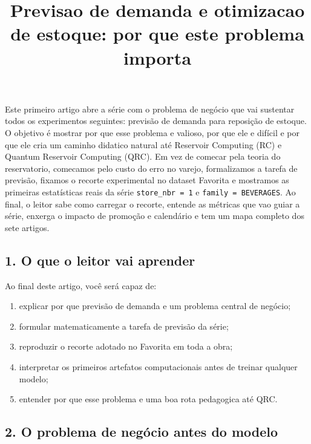 \documentclass[12pt]{article}
\title{Previsao de demanda e otimizacao de estoque: por que este problema importa}
\author{}
\providecommand{\tightlist}{%
          \setlength{\itemsep}{0pt}\setlength{\parskip}{0pt}}
\begin{document}
        \maketitle

        \begin{resumo}
        Este primeiro artigo abre a série com o problema de negócio que vai sustentar todos os experimentos seguintes: previsão de demanda para reposição de estoque. O objetivo é mostrar por que esse problema e valioso, por que ele e difícil e por que ele cria um caminho didatico natural até Reservoir Computing (RC) e Quantum Reservoir Computing (QRC). Em vez de comecar pela teoria do reservatorio, comecamos pelo custo do erro no varejo, formalizamos a tarefa de previsão, fixamos o recorte experimental no dataset Favorita e mostramos as primeiras estatísticas reais da série \texttt{store\_nbr\ =\ 1} e \texttt{family\ =\ BEVERAGES}. Ao final, o leitor sabe como carregar o recorte, entende as métricas que vao guiar a série, enxerga o impacto de promoção e calendário e tem um mapa completo dos sete artigos.
        \end{resumo}

        \subsection{1. O que o leitor vai aprender}\label{1-o-que-o-leitor-vai-aprender}

Ao final deste artigo, você será capaz de:

\begin{enumerate}
\def\labelenumi{\arabic{enumi}.}
\tightlist
\item
  explicar por que previsão de demanda e um problema central de negócio;
\item
  formular matematicamente a tarefa de previsão da série;
\item
  reproduzir o recorte adotado no Favorita em toda a obra;
\item
  interpretar os primeiros artefatos computacionais antes de treinar qualquer modelo;
\item
  entender por que esse problema e uma boa rota pedagogica até QRC.
\end{enumerate}

\subsection{2. O problema de negócio antes do modelo}\label{2-o-problema-de-neguxf3cio-antes-do-modelo}
\end{document}
